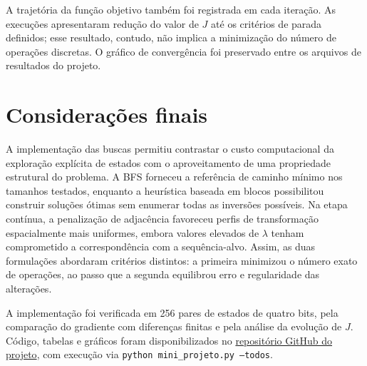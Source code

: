 \documentclass[10pt,a4paper,twocolumn]{article}
\begin{document}
A trajetória da função objetivo também foi registrada em cada iteração. As execuções apresentaram redução do valor de $J$ até os critérios de parada definidos; esse resultado, contudo, não implica a minimização do número de operações discretas. O gráfico de convergência foi preservado entre os arquivos de resultados do projeto.

\section{Considerações finais}
A implementação das buscas permitiu contrastar o custo computacional da exploração explícita de estados com o aproveitamento de uma propriedade estrutural do problema. A BFS forneceu a referência de caminho mínimo nos tamanhos testados, enquanto a heurística baseada em blocos possibilitou construir soluções ótimas sem enumerar todas as inversões possíveis. Na etapa contínua, a penalização de adjacência favoreceu perfis de transformação espacialmente mais uniformes, embora valores elevados de $\lambda$ tenham comprometido a correspondência com a sequência-alvo. Assim, as duas formulações abordaram critérios distintos: a primeira minimizou o número exato de operações, ao passo que a segunda equilibrou erro e regularidade das alterações.

A implementação foi verificada em 256 pares de estados de quatro bits, pela comparação do gradiente com diferenças finitas e pela análise da evolução de $J$. Código, tabelas e gráficos foram disponibilizados no \href{https://github.com/LuanDinizMR/mini-projeto-buscas-otimizacao-IA-0}{repositório GitHub do projeto}, com execução via \texttt{python mini\_projeto.py --todos}.
\end{document}
